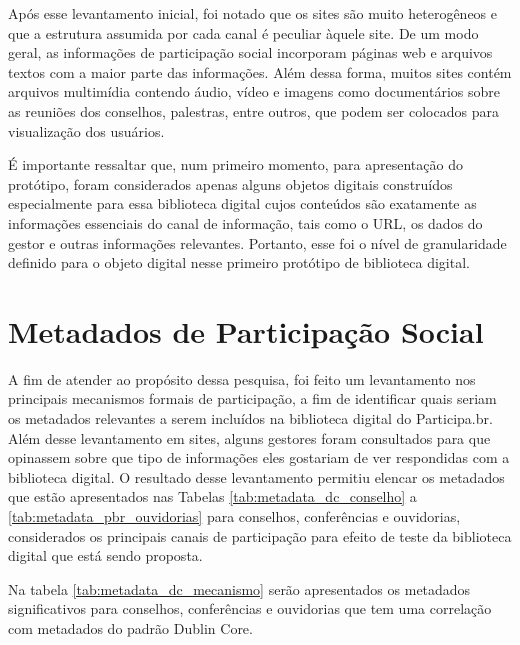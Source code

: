 Após esse levantamento inicial, foi notado que os sites são muito heterogêneos e que a estrutura assumida por cada canal é peculiar àquele site. De um modo geral, as informações de participação social incorporam páginas web e arquivos textos com a maior parte das informações. Além dessa forma, muitos sites contém arquivos multimídia contendo áudio, vídeo e imagens como documentários sobre as reuniões dos conselhos, palestras, entre outros, que podem ser colocados para visualização dos usuários.

É importante ressaltar que, num primeiro momento, para apresentação do protótipo, foram considerados apenas alguns objetos digitais construídos especialmente para essa biblioteca digital cujos conteúdos são exatamente as informações essenciais do canal de informação, tais como o URL, os dados do gestor e outras informações relevantes. Portanto, esse foi o nível de granularidade definido para o objeto digital nesse primeiro protótipo de biblioteca digital.


\section{Metadados de Participação Social}
\label{sub:metadadospbr}

A fim de atender ao propósito dessa pesquisa, foi feito um levantamento nos principais mecanismos formais de participação, a fim de identificar quais seriam os metadados relevantes a serem incluídos na biblioteca digital do Participa.br. Além desse levantamento em sites, alguns gestores foram consultados para que opinassem sobre que tipo de informações eles gostariam de ver respondidas com a biblioteca digital. O resultado desse levantamento permitiu elencar os metadados que estão apresentados nas Tabelas \ref{tab:metadata_dc_conselho} a \ref{tab:metadata_pbr_ouvidorias} para conselhos, conferências e ouvidorias, considerados os principais canais de participação para efeito de teste da biblioteca digital que está sendo proposta.

Na tabela \ref{tab:metadata_dc_mecanismo} serão apresentados os metadados significativos para conselhos, conferências e ouvidorias que tem uma correlação com metadados do padrão Dublin Core.

\makeatother 

